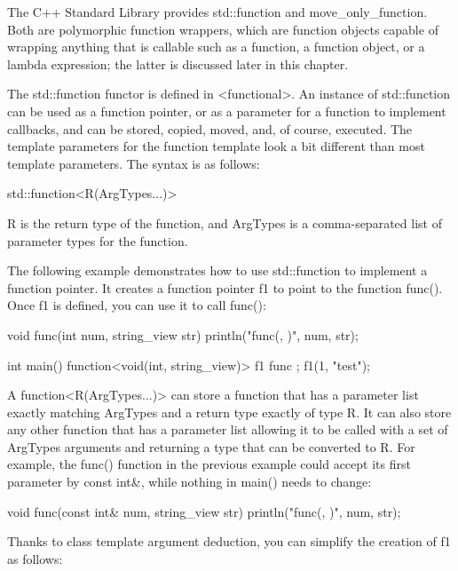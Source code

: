 
The C++ Standard Library provides std::function and move\_only\_function. Both are polymorphic function wrappers, which are function objects capable of wrapping anything that is callable such as a function, a function object, or a lambda expression; the latter is discussed later in this chapter.


The std::function functor is defined in <functional>. An instance of std::function can be used as a function pointer, or as a parameter for a function to implement callbacks, and can be stored, copied, moved, and, of course, executed. The template parameters for the function template look a bit different than most template parameters. The syntax is as follows:

\begin{cpp}
std::function<R(ArgTypes...)>
\end{cpp}

R is the return type of the function, and ArgTypes is a comma-separated list of parameter types for the function.

The following example demonstrates how to use std::function to implement a function pointer. It creates a function pointer f1 to point to the function func(). Once f1 is defined, you can use it to call func():

\begin{cpp}
void func(int num, string_view str) { println("func({}, {})", num, str); }

int main()
{
    function<void(int, string_view)> f1 { func };
    f1(1, "test");
}
\end{cpp}

A function<R(ArgTypes...)> can store a function that has a parameter list exactly matching ArgTypes and a return type exactly of type R. It can also store any other function that has a parameter list allowing it to be called with a set of ArgTypes arguments and returning a type that can be converted to R. For example, the func() function in the previous example could accept its first parameter by const int\&, while nothing in main() needs to change:

\begin{cpp}
void func(const int& num, string_view str) { println("func({}, {})", num, str); }
\end{cpp}

Thanks to class template argument deduction, you can simplify the creation of f1 as follows:

